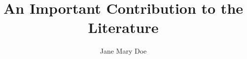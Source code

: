 
%


\usepackage[numbered]{bookmark}


\usepackage[round]{natbib}



\usepackage{blindtext}



\author{Jane Mary Doe}


\title{An Important Contribution to the Literature}












\makepagenote


% 


% 


